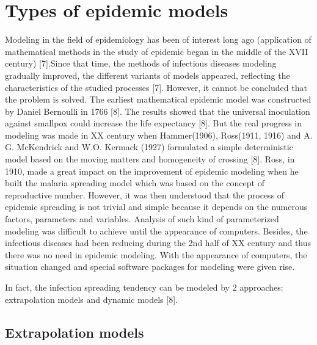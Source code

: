 \section{Types of epidemic models}

Modeling in the field of epidemiology has been of interest long ago (application of mathematical methods in the study of epidemic began in the middle of the XVII century) [7].Since that time, the methods of infectious diseases modeling gradually improved, the different variants of models appeared, reflecting the characteristics of the studied processes [7]. However, it cannot be concluded that the problem is solved. The earliest mathematical epidemic model was constructed by Daniel Bernoulli in 1766 [8]. The results showed that the universal inoculation against smallpox could increase the life expectancy [8]. But the real progress in modeling was made in XX century when Hammer(1906), Ross(1911, 1916) and A. G. McKendrick and W.O. Kermack (1927) formulated a simple deterministic model based on the moving matters and homogeneity of crossing [8]. Ross, in 1910, made a great impact on the improvement of epidemic modeling when he built the malaria spreading model which was based on the concept of reproductive number. However, it was then understood that the process of epidemic spreading is not trivial and simple because it depends on the numerous factors, parameters and variables. Analysis of such kind of parameterized modeling was difficult to achieve until the appearance of computers. Besides, the infectious diseases had been reducing during the 2nd half of XX century and thus there was no need in epidemic modeling. With the appearance of computers, the situation changed and special software packages for modeling were given rise.

In fact, the infection spreading tendency can be modeled by 2 approaches: extrapolation models and dynamic models [8].

\subsection{Extrapolation models}

